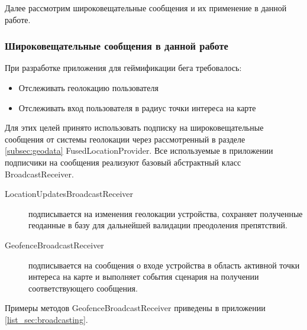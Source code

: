 Далее рассмотрим широковещательные сообщения и их применение в данной работе.

\subsubsection*{Широковещательные сообщения в данной работе}
При разработке приложения для геймификации бега требовалось:
\begin{itemize}
	\item Отслеживать геолокацию пользователя
	\item Отслеживать вход пользователя в радиус точки интереса на карте
\end{itemize}
\smallskip
Для этих целей принято использовать подписку на широковещательные сообщения от системы геолокации через рассмотренный в разделе \ref{subsec:geodata} FusedLocationProvider.
Все используемые в приложении подписчики на сообщения реализуют базовый абстрактный класс BroadcastReceiver.
\begin{description}
	\item[LocationUpdatesBroadcastReceiver] подписывается на изменения геолокации устройства, сохраняет полученные геоданные в базу для дальнейшей валидации преодоления препятствий.
	\item[GeofenceBroadcastReceiver] подписывается на сообщения о входе устройства в область активной точки интереса на карте и выполняет события сценария на получении соответствующего сообщения.
\end{description}
\smallskip
Примеры методов GeofenceBroadcastReceiver приведены в приложении \ref{list_sec:broadcasting}.